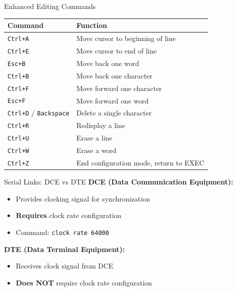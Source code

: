 \documentclass[12pt,a4paper]{article}
\begin{document}
\begin{theorybox}{Enhanced Editing Commands}
\begin{center}
\begin{tabular}{ll}
\toprule
\textbf{Command} & \textbf{Function} \\
\midrule
\texttt{Ctrl+A} & Move cursor to beginning of line \\
\texttt{Ctrl+E} & Move cursor to end of line \\
\texttt{Esc+B} & Move back one word \\
\texttt{Ctrl+B} & Move back one character \\
\texttt{Ctrl+F} & Move forward one character \\
\texttt{Esc+F} & Move forward one word \\
\texttt{Ctrl+D} / \texttt{Backspace} & Delete a single character \\
\texttt{Ctrl+R} & Redisplay a line \\
\texttt{Ctrl+U} & Erase a line \\
\texttt{Ctrl+W} & Erase a word \\
\texttt{Ctrl+Z} & End configuration mode, return to EXEC \\
\bottomrule
\end{tabular}
\end{center}
\end{theorybox}

\begin{theorybox}{Serial Links: DCE vs DTE}
\textbf{DCE (Data Communication Equipment):}
\begin{itemize}[noitemsep]
    \item Provides clocking signal for synchronization
    \item \textbf{Requires} clock rate configuration
    \item Command: \texttt{clock rate 64000}
\end{itemize}

\vspace{0.2cm}
\textbf{DTE (Data Terminal Equipment):}
\begin{itemize}[noitemsep]
    \item Receives clock signal from DCE
    \item \textbf{Does NOT} require clock rate configuration
\end{itemize}
\end{theorybox}

\end{document}
